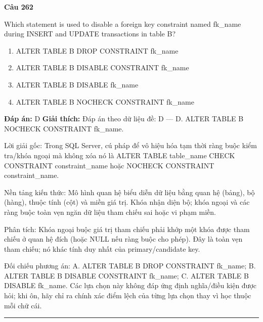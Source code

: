 \documentclass[11pt,a4paper]{article}
\newenvironment{question}[1]{%
  \par\vspace{1em}\noindent\textbf{\large Câu #1}\par\vspace{0.4em}
}{%
  \par\vspace{1em}\hrule\vspace{0.6em}
}
\newenvironment{choices}{%
  \begin{enumerate}[label=\textbf{\Alph*.},leftmargin=2.2em,itemsep=2pt,topsep=3pt]
}{%
  \end{enumerate}
}
\newcommand{\choice}{\item}
\begin{document}
\begin{question}{262}
Which statement is used to disable a foreign key constraint named fk_name during INSERT and UPDATE transactions in table B?
\begin{choices}
\choice ALTER TABLE B DROP CONSTRAINT fk_name
\choice ALTER TABLE B DISABLE CONSTRAINT fk_name
\choice ALTER TABLE B DISABLE fk_name
\choice ALTER TABLE B NOCHECK CONSTRAINT fk_name
\end{choices}
\textbf{Đáp án:} D
\textbf{Giải thích:} Đáp án theo dữ liệu đề: D — D. ALTER TABLE B NOCHECK CONSTRAINT fk_name.

Lời giải gốc: Trong SQL Server, cú pháp để vô hiệu hóa tạm thời ràng buộc kiểm tra/khóa ngoại mà không xóa nó là ALTER TABLE table_name CHECK CONSTRAINT constraint_name hoặc NOCHECK CONSTRAINT constraint_name.

Nền tảng kiến thức: Mô hình quan hệ biểu diễn dữ liệu bằng quan hệ (bảng), bộ (hàng), thuộc tính (cột) và miền giá trị. Khóa nhận diện bộ; khóa ngoại và các ràng buộc toàn vẹn ngăn dữ liệu tham chiếu sai hoặc vi phạm miền.

Phân tích: Khóa ngoại buộc giá trị tham chiếu phải khớp một khóa được tham chiếu ở quan hệ đích (hoặc NULL nếu ràng buộc cho phép). Đây là toàn vẹn tham chiếu; nó khác tính duy nhất của primary/candidate key.

Đối chiếu phương án: A. ALTER TABLE B DROP CONSTRAINT fk_name; B. ALTER TABLE B DISABLE CONSTRAINT fk_name; C. ALTER TABLE B DISABLE fk_name. Các lựa chọn này không đáp ứng định nghĩa/điều kiện được hỏi; khi ôn, hãy chỉ ra chính xác điểm lệch của từng lựa chọn thay vì học thuộc mỗi chữ cái.
\end{question}
\end{document}

